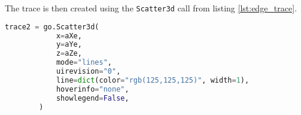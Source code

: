 The trace is then created using the \texttt{Scatter3d} call from listing \ref{lst:edge_trace}.
\begin{lstlisting}[language=python, caption={Creation of the edge trace}, label={lst:edge_trace}]
trace2 = go.Scatter3d(
            x=aXe,
            y=aYe,
            z=aZe,
            mode="lines",
            uirevision="0",
            line=dict(color="rgb(125,125,125)", width=1),
            hoverinfo="none",
            showlegend=False,
        )
    \end{lstlisting}
